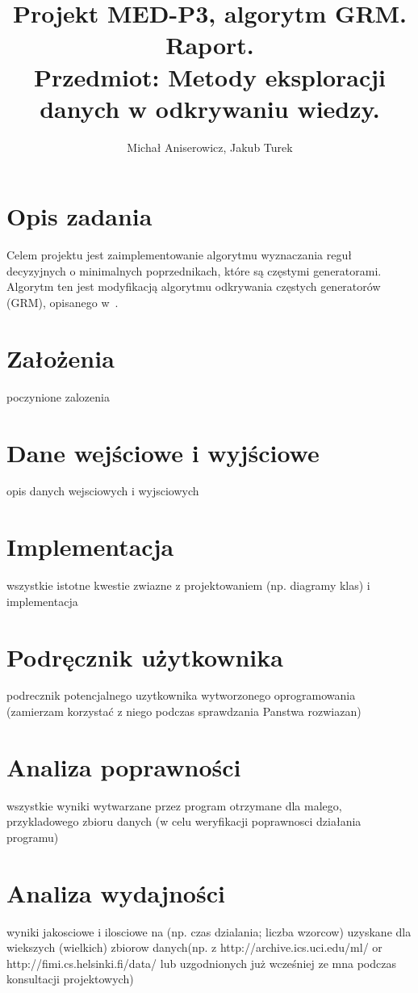 \documentclass[a4paper,10pt]{article}
\title{Projekt MED-P3, algorytm GRM. Raport. \\ \small{Przedmiot: Metody eksploracji danych w odkrywaniu wiedzy.}}
\author{Michał Aniserowicz, Jakub Turek}
\date{}
\begin{document}
\maketitle

\section*{Opis zadania}
Celem projektu jest zaimplementowanie algorytmu wyznaczania reguł decyzyjnych o minimalnych poprzednikach, które są częstymi generatorami.
Algorytm ten jest modyfikacją algorytmu odkrywania częstych generatorów (GRM), opisanego w~\cite{grm}.



\section*{Założenia}
poczynione zalozenia



\section*{Dane wejściowe i wyjściowe}
opis danych wejsciowych i wyjsciowych



\section*{Implementacja}
wszystkie istotne kwestie zwiazne z projektowaniem (np. diagramy klas) i implementacja



\section*{Podręcznik użytkownika}
podrecznik potencjalnego uzytkownika wytworzonego oprogramowania
(zamierzam korzystać z niego podczas sprawdzania Panstwa rozwiazan)



\section*{Analiza poprawności}
wszystkie wyniki wytwarzane przez program otrzymane dla malego,
przykladowego zbioru danych (w celu weryfikacji poprawnosci działania
programu)



\section*{Analiza wydajności}
wyniki jakosciowe i ilosciowe na (np. czas dzialania; liczba wzorcow)
uzyskane dla wiekszych (wielkich) zbiorow danych(np. z
http://archive.ics.uci.edu/ml/ or http://fimi.cs.helsinki.fi/data/ lub
uzgodnionych już wcześniej ze mna podczas konsultacji projektowych)
\end{document}
